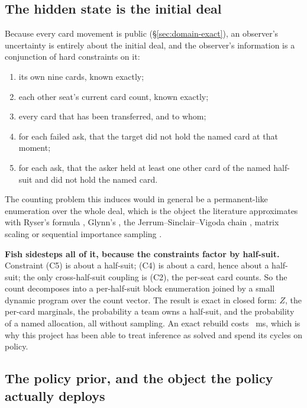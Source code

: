 \subsection{The hidden state is the initial deal}
\label{sec:engine-belief}

Because every card movement is public (\S\ref{sec:domain-exact}), an observer's uncertainty is
entirely about the initial deal, and the observer's information is a conjunction of hard
constraints on it:

\begin{enumerate}
\item[(C1)] its own nine cards, known exactly;
\item[(C2)] each other seat's current card count, known exactly;
\item[(C3)] every card that has been transferred, and to whom;
\item[(C4)] for each failed ask, that the target did not hold the named card at that moment;
\item[(C5)] for each ask, that the asker held at least one other card of the named half-suit and did
      not hold the named card.
\end{enumerate}

The counting problem this induces would in general be a permanent-like enumeration over the whole
deal, which is the object the literature approximates with Ryser's formula \cite{ryser}, Glynn's
\cite{glynn}, the Jerrum--Sinclair--Vigoda chain \cite{jsv}, matrix scaling \cite{lsw} or sequential
importance sampling \cite{chen-sis}.

\textbf{Fish sidesteps all of it, because the constraints factor by half-suit.} Constraint (C5) is
about a half-suit; (C4) is about a card, hence about a half-suit; the only cross-half-suit coupling
is (C2), the per-seat card counts. So the count decomposes into a per-half-suit block enumeration
joined by a small dynamic program over the count vector. The result is exact in closed form:
$Z$, the per-card marginals, the probability a team owns a half-suit, and the probability of a named
allocation, all without sampling. An exact rebuild costs \vsixCountCost{}~ms, which is why this
project has been able to treat inference as solved and spend its cycles on policy.

\subsection{The policy prior, and the object the policy actually deploys}
\label{sec:engine-prior}

